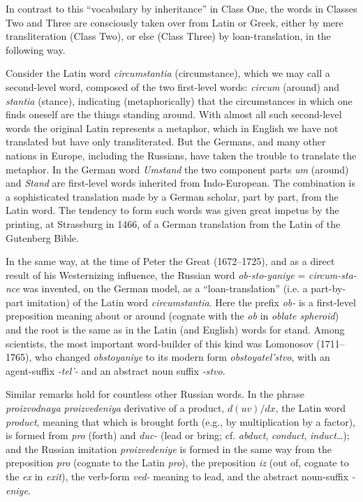 In contrast to this ``vocabulary by inheritance'' in Class One, the words in Classes Two and Three are consciously taken over from Latin or Greek, either by mere transliteration (Class Two), or else (Class Three) by loan-translation, in the following way.

Consider the Latin word \emph{circumstantia} (circumstance), which we may call a second-level word, composed of the two first-level words: \emph{circum} (around) and \emph{stantia} (stance), indicating (metaphorically) that the circumstances in which one finds oneself are the things standing around. With almost all such second-level words the original Latin represents a metaphor, which in English we have not translated but have only transliterated. But the Germans, and many other nations in Europe, including the Russians, have taken the trouble to translate the metaphor. In the German word \emph{Umstand} the two component parts \emph{um} (around) and \emph{Stand} are first-level words inherited from Indo-European. The combination is a sophisticated translation made by a German scholar, part by part, from the Latin word. The tendency to form such words was given great impetus by the printing, at Strassburg in 1466, of a German translation from the Latin of the Gutenberg Bible.

In the same way, at the time of Peter the Great (1672--1725), and as a direct result of his Westernizing influence, the Russian word \emph{ob-sto-yaniye} = \emph{circum-sta-nce} was invented, on the German model, as a ``loan-translation'' (i.e. a part-by-part imitation) of the Latin word \emph{circumstantia}. Here the prefix \emph{ob-} is a first-level preposition meaning about or around (cognate with the \emph{ob} in \emph{oblate spheroid}) and the root is the same as in the Latin (and English) words for stand. Among scientists, the most important word-builder of this kind was Lomonosov (1711--1765), who changed \emph{obstoyaniye} to its modern form \emph{obstoyatel'stvo}, with an agent-suffix \emph{-tel'-} and an abstract noun suffix \emph{-stvo}.

Similar remarks hold for countless other Russian words. In the phrase \emph{proizvodnaya proizvedeniya} derivative of a product, $d(uv)/dx$, the Latin word \emph{product}, meaning that which is brought forth (e.g., by multiplication by a factor), is formed from \emph{pro} (forth) and \emph{duc-} (lead or bring; cf. \emph{abduct}, \emph{conduct}, \emph{induct}\ldots); and the Russian imitation \emph{proizvedeniye} is formed in the same way from the preposition \emph{pro} (cognate to the Latin \emph{pro}), the preposition \emph{iz} (out of, cognate to the \emph{ex} in \emph{exit}), the verb-form \emph{ved-} meaning to lead, and the abstract noun-suffix \emph{-eniye}.

